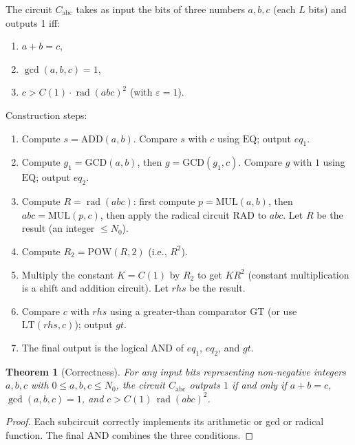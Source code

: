 \documentclass[11pt,a4paper]{article}
\newtheorem{theorem}{Theorem}[section]
\begin{document}
The circuit $C_{\text{abc}}$ takes as input the bits of three numbers $a,b,c$ (each $L$ bits) and outputs 1 iff:
\begin{enumerate}
\item $a+b = c$,
\item $\gcd(a,b,c)=1$,
\item $c > C(1) \cdot \operatorname{rad}(abc)^{2}$ (with $\varepsilon=1$).
\end{enumerate}

Construction steps:
\begin{enumerate}
\item Compute $s = \mathrm{ADD}(a,b)$. Compare $s$ with $c$ using $\mathrm{EQ}$; output $eq_1$.
\item Compute $g_1 = \mathrm{GCD}(a,b)$, then $g = \mathrm{GCD}(g_1,c)$. Compare $g$ with $1$ using $\mathrm{EQ}$; output $eq_2$.
\item Compute $R = \operatorname{rad}(abc)$: first compute $p = \mathrm{MUL}(a,b)$, then $abc = \mathrm{MUL}(p,c)$, then apply the radical circuit $\mathrm{RAD}$ to $abc$. Let $R$ be the result (an integer $\le N_0$).
\item Compute $R_2 = \mathrm{POW}(R,2)$ (i.e., $R^2$).
\item Multiply the constant $K = C(1)$ by $R_2$ to get $K R^2$ (constant multiplication is a shift and addition circuit). Let $rhs$ be the result.
\item Compare $c$ with $rhs$ using a greater‑than comparator $\mathrm{GT}$ (or use $\mathrm{LT}(rhs, c)$); output $gt$.
\item The final output is the logical AND of $eq_1$, $eq_2$, and $gt$.
\end{enumerate}

\begin{theorem}[Correctness]\label{thm:correct}
For any input bits representing non‑negative integers $a,b,c$ with $0\le a,b,c \le N_0$, the circuit $C_{\text{abc}}$ outputs $1$ if and only if $a+b=c$, $\gcd(a,b,c)=1$, and $c > C(1)\,\operatorname{rad}(abc)^{2}$.
\end{theorem}
\begin{proof}
Each subcircuit correctly implements its arithmetic or gcd or radical function. The final AND combines the three conditions.
\end{proof}
\end{document}
